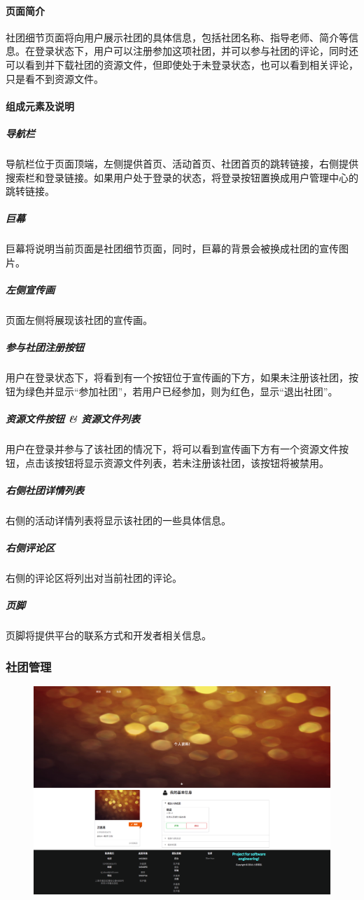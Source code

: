 \documentclass[UTF8]{ctexart}
\begin{document}
\paragraph{页面简介}
社团细节页面将向用户展示社团的具体信息，包括社团名称、指导老师、简介等信息。在登录状态下，用户可以注册参加这项社团，并可以参与社团的评论，同时还可以看到并下载社团的资源文件，但即使处于未登录状态，也可以看到相关评论，只是看不到资源文件。

\paragraph{组成元素及说明}
\subparagraph*{导航栏}
导航栏位于页面顶端，左侧提供首页、活动首页、社团首页的跳转链接，右侧提供搜索栏和登录链接。如果用户处于登录的状态，将登录按钮置换成用户管理中心的跳转链接。
\subparagraph*{巨幕}
巨幕将说明当前页面是社团细节页面，同时，巨幕的背景会被换成社团的宣传图片。
\subparagraph*{左侧宣传画}
页面左侧将展现该社团的宣传画。
\subparagraph*{参与社团注册按钮}
用户在登录状态下，将看到有一个按钮位于宣传画的下方，如果未注册该社团，按钮为绿色并显示“参加社团”，若用户已经参加，则为红色，显示“退出社团”。
\subparagraph*{资源文件按钮 \& 资源文件列表}
用户在登录并参与了该社团的情况下，将可以看到宣传画下方有一个资源文件按钮，点击该按钮将显示资源文件列表，若未注册该社团，该按钮将被禁用。
\subparagraph*{右侧社团详情列表}
右侧的活动详情列表将显示该社团的一些具体信息。
\subparagraph*{右侧评论区}
右侧的评论区将列出对当前社团的评论。
\subparagraph*{页脚}
页脚将提供平台的联系方式和开发者相关信息。

\subsubsection{社团管理}
\begin{figure}[H]
\centering
\includegraphics[width = .9\textwidth]{web-club-admin.png}
\end{figure}
\end{document}
